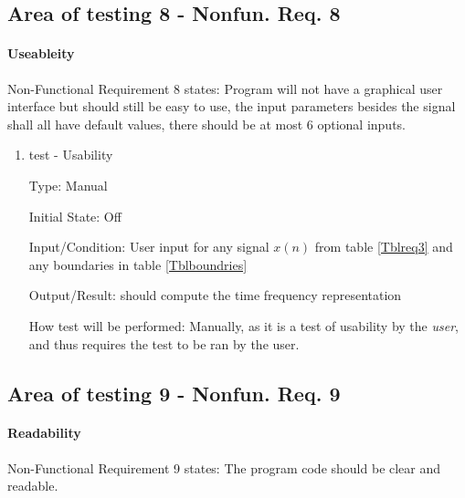 \documentclass[12pt, titlepage]{article}
\begin{document}
\subsection{Area of testing 8 - Nonfun. Req. 8} \label{test_usability}
\paragraph{Useableity}

Non-Functional Requirement 8 states: Program will not have a graphical user interface but should still be easy to use, the input parameters besides the signal shall all have default values, there should be at most 6 optional inputs.

\begin{enumerate}

\item{test - Usability\\}

Type: Manual
					
Initial State: Off
					
Input/Condition: User input for any signal $x(n)$ from table \ref{Tblreq3} and any boundaries in table \ref{Tblboundries}
					
Output/Result: \progname{} should compute the time frequency representation
					
How test will be performed: Manually, as it is a test of usability by the \emph{user}, and thus requires the test to be ran by the user.
					
\end{enumerate}

\subsection{Area of testing 9 - Nonfun. Req. 9} \label{test_readability}
\paragraph{Readability}

Non-Functional Requirement 9 states: The program code should be clear and readable.
\end{document}

